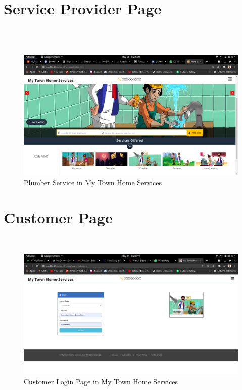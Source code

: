 \documentclass[12pt,a4paper]{report}
\begin{document}
\begin{titlepage}
{{{\section{ Service Provider Page}\\ \\[3.0cm]
\begin{figure}[h!]
	\begin{center}
		 \includegraphics[width=1.0\linewidth,height=0.5\textheight]{plumber.jpeg}
	\end{center}
	\caption{Plumber Service in My Town Home Services}
\end{figure}
\raggedright

}

\newpage
\section{ Customer Page}\\[3.0cm]
\begin{figure}[h!]
	\begin{center}
		 \includegraphics[width=1.0\linewidth,height=0.5\textheight]{custom.jpeg}
	\end{center}
	\caption{Customer Login Page in My Town Home Services}
\end{figure}

}}
\end{titlepage}
\end{document}
